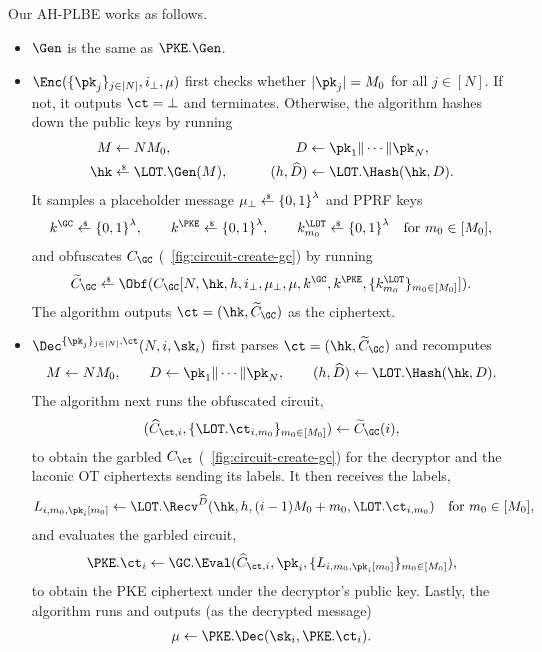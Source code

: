 \begin{construction}[AH-PLBE]\label{con:ahplbe}
Our AH-PLBE works as follows.
\begin{itemize}
\item $\Gen$ is the same as $\PKE.\Gen$.
\item $\Enc(\{\pk_j\}_{j\in[N]},i_\bot,\mu)$
first checks whether ${|\pk_j|=M_0}$ for all ${j\in[N]}$.
If not, it outputs ${\ct=\bot}$ and terminates.
Otherwise, the algorithm hashes down the public keys by running
\begin{align*}
M&\mathrlap{{}\gets NM_0,}
\hspace*{14em}
\mathllap{D}{}\gets\pk_1\concat\cdots\concat\pk_N,\\
\hk&\mathrlap{{}\draws\LOT.\Gen(M),}
\hspace*{14em}
\mathllap{(h,\widehat{D})}{}\gets\LOT.\Hash(\hk,D).
\end{align*}
It samples a placeholder message ${\mu_\bot\draws\bit^\lambda}$ and PPRF keys
\begin{align*}
k^\GC\draws\bit^\lambda,\qquad
k^\PKE\draws\bit^\lambda,\qquad
k^\LOT_{m_0}\draws\bit^\lambda\quad\textup{for }m_0\in[M_0],
\end{align*}
and obfuscates $C_\GC$ (\Figure~\ref{fig:circuit-create-gc}) by running
\begin{align*}
\widetilde{C}_\GC\draws\Obf(C_\GC[
N,\hk,h,i_\bot,\mu_\bot,\mu,
k^\GC,k^\PKE,\{k^\LOT_{m_0}\}_{m_0\in[M_0]}]).
\end{align*}
The algorithm outputs ${\ct=(\hk,\widetilde{C}_\GC)}$ as the ciphertext.
\item $\Dec^{\{\pk_j\}_{j\in[N]},\ct}(N,i,\sk_i)$
first parses ${\ct=(\hk,\widetilde{C}_\GC)}$ and recomputes
\begin{align*}
M\gets NM_0,\qquad
D\gets\pk_1\concat\cdots\concat\pk_N,\qquad
(h,\widehat{D})\gets\LOT.\Hash(\hk,D).
\end{align*}
The algorithm next runs the obfuscated circuit,
\begin{align*}
(\widehat{C}_{\ct,i},\{\LOT.\ct_{i,m_0}\}_{m_0\in[M_0]})
\gets\widetilde{C}_\GC(i),
\end{align*}
to obtain the garbled $C_\ct$ (\Figure~\ref{fig:circuit-create-gc}) for the decryptor and the laconic OT ciphertexts sending its labels.
It then receives the labels,
\begin{align*}
\WideNarrow{}{\hspace*{-1.5em}}
L_{i,m_0,\pk_i[m_0]}
\gets\LOT.\Recv^{\widehat{D}}(\hk,h,(i-1)M_0+m_0,\LOT.\ct_{i,m_0})
\WideNarrow{\quad\textup{for }}{\textup{ for }}
m_0\in[M_0],
\end{align*}
and evaluates the garbled circuit,
\begin{align*}
\PKE.\ct_i\gets\GC.\Eval(
\widehat{C}_{\ct,i},
\pk_i,
\{L_{i,m_0,\pk_i[m_0]}\}_{m_0\in[M_0]}
),
\end{align*}
to obtain the PKE ciphertext under the decryptor's public key.
Lastly, the algorithm runs and outputs (as the decrypted message)
\begin{align*}
\mu\gets\PKE.\Dec(\sk_i,\PKE.\ct_i).
\end{align*}
\end{itemize}
\end{construction}

